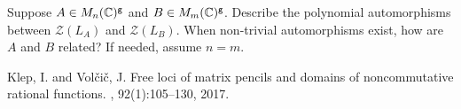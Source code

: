 \begin{problem}
	Suppose $A\in M_n(\mathbb{C})^{\texttt{g}}$ and $B\in M_m(\mathbb{C})^{\texttt{g}}$. Describe the polynomial automorphisms between $\mathscr{Z}(L_A)$ and 
	$\mathscr{Z}(L_B)$. When non-trivial automorphisms exist, how are $A$ and $B$ related? If needed, assume $n=m$.
\end{problem}




\begin{thebibliography}{1}

Klep, I. and Vol{\v c}i{\v c}, J.
\newblock Free loci of matrix pencils and domains of noncommutative rational functions.
, 92(1):105--130, 2017.



\end{thebibliography}